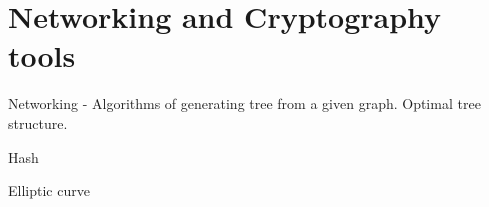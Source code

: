 \chapter{Networking and Cryptography tools} %
\label{cha:Networking and Cryptography tools}


Networking - Algorithms of generating tree from a given graph. Optimal tree structure.

Hash

Elliptic curve